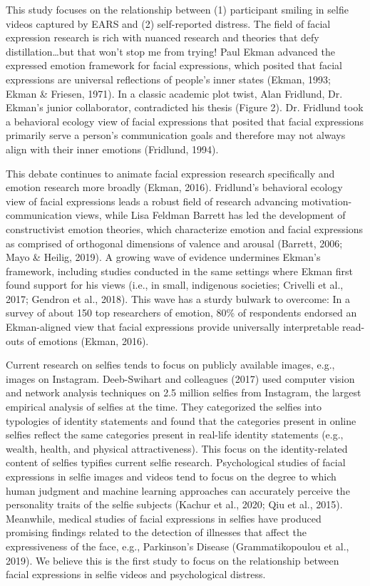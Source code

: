 \documentclass[authordate, empirical,issue]{jote-new-article}
\begin{document}
This study focuses on the relationship between (1) participant smiling in selfie videos captured by EARS and (2) self-reported distress. The field of facial expression research is rich with nuanced research and theories that defy distillation…but that won't stop me from trying! Paul Ekman advanced the expressed emotion framework for facial expressions, which posited that facial expressions are universal reflections of people's inner states (Ekman, 1993; Ekman \& Friesen, 1971). In a classic academic plot twist, Alan Fridlund, Dr. Ekman's junior collaborator, contradicted his thesis (Figure 2). Dr. Fridlund took a behavioral ecology view of facial expressions that posited that facial expressions primarily serve a person's communication goals and therefore may not always align with their inner emotions (Fridlund, 1994).



This debate continues to animate facial expression research specifically and emotion research more broadly (Ekman, 2016). Fridlund's behavioral ecology view of facial expressions leads a robust field of research advancing motivation-communication views, while Lisa Feldman Barrett has led the development of constructivist emotion theories, which characterize emotion and facial expressions as comprised of orthogonal dimensions of valence and arousal (Barrett, 2006; Mayo \& Heilig, 2019). A growing wave of evidence undermines Ekman's framework, including studies conducted in the same settings where Ekman first found support for his views (i.e., in small, indigenous societies; Crivelli et al., 2017; Gendron et al., 2018). This wave has a sturdy bulwark to overcome: In a survey of about 150 top researchers of emotion, 80\% of respondents endorsed an Ekman-aligned view that facial expressions provide universally interpretable read-outs of emotions (Ekman, 2016).



Current research on selfies tends to focus on publicly available images, e.g., images on Instagram. Deeb-Swihart and colleagues (2017) used computer vision and network analysis techniques on 2.5 million selfies from Instagram, the largest empirical analysis of selfies at the time. They categorized the selfies into typologies of identity statements and found that the categories present in online selfies reflect the same categories present in real-life identity statements (e.g., wealth, health, and physical attractiveness). This focus on the identity-related content of selfies typifies current selfie research. Psychological studies of facial expressions in selfie images and videos tend to focus on the degree to which human judgment and machine learning approaches can accurately perceive the personality traits of the selfie subjects (Kachur et al., 2020; Qiu et al., 2015). Meanwhile, medical studies of facial expressions in selfies have produced promising findings related to the detection of illnesses that affect the expressiveness of the face, e.g., Parkinson's Disease (Grammatikopoulou et al., 2019). We believe this is the first study to focus on the relationship between facial expressions in selfie videos and psychological distress.
\end{document}
